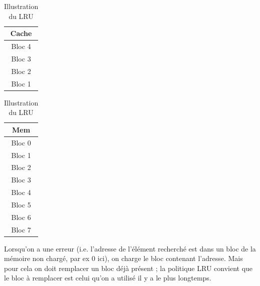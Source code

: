 \documentclass[12pt]{base}
\begin{document}
\begin{table}[H]
    \centering
    \begin{minipage}{.2\linewidth}
        \centering
        \begin{tabular}{|c|}
            \multicolumn{1}{c}{Cache} \\ \hline
            Bloc 4\\ \hline
            Bloc 3\\ \hline
            Bloc 2\\ \hline
            Bloc 1\\ \hline
        \end{tabular}
    \end{minipage}%
    \begin{minipage}{.2\linewidth}
        \centering
        \begin{tabular}{|c|}
            \multicolumn{1}{c}{Mem} \\ \hline
            Bloc 0\\ \hline
            Bloc 1\\ \hline
            Bloc 2\\ \hline
            Bloc 3\\ \hline
            Bloc 4\\ \hline
            Bloc 5\\ \hline
            Bloc 6\\ \hline
            Bloc 7\\ \hline
        \end{tabular}
    \end{minipage}
\caption{Illustration du LRU\\}

\label{tab:miss}   
\end{table}

    
Lorsqu'on a une erreur (i.e. l'adresse de l'élément recherché est dans un bloc de la mémoire non chargé, par ex 0 ici), on charge le bloc contenant l'adresse. Mais pour cela on doit remplacer un bloc déjà présent ; la politique LRU convient que le bloc à remplacer est celui qu'on a utilisé il y a le plus longtemps.   
\vspace{2cm}
\end{document}
